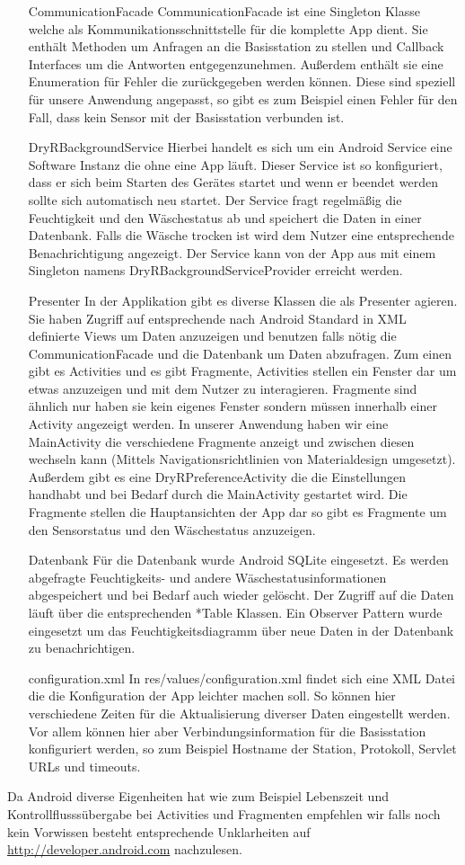 \begin{enumerate}
	\item[CommunicationFacade] CommunicationFacade ist eine Singleton Klasse welche als Kommunikationsschnittstelle für die komplette App dient. Sie enthält Methoden um Anfragen an die Basisstation zu stellen und Callback Interfaces um die Antworten entgegenzunehmen. Außerdem enthält sie eine Enumeration für Fehler die zurückgegeben werden können. Diese sind speziell für unsere Anwendung angepasst, so gibt es zum Beispiel einen Fehler für den Fall, dass kein Sensor mit der Basisstation verbunden ist.
	
	\item[DryRBackgroundService] Hierbei handelt es sich um ein Android Service eine Software Instanz die ohne eine App läuft. Dieser Service ist so konfiguriert, dass er sich beim Starten des Gerätes startet und wenn er beendet werden sollte sich automatisch neu startet. Der Service fragt regelmäßig die Feuchtigkeit und den Wäschestatus ab und speichert die Daten in einer Datenbank. Falls die Wäsche trocken ist wird dem Nutzer eine entsprechende Benachrichtigung angezeigt. Der Service kann von der App aus mit einem Singleton namens DryRBackgroundServiceProvider erreicht werden.
	
	\item[Presenter] In der Applikation gibt es diverse Klassen die als Presenter agieren. Sie haben Zugriff auf entsprechende nach Android Standard in XML definierte Views um Daten anzuzeigen und benutzen falls nötig die CommunicationFacade und die Datenbank um Daten abzufragen. Zum einen gibt es Activities und es gibt Fragmente, Activities stellen ein Fenster dar um etwas anzuzeigen und mit dem Nutzer zu interagieren. Fragmente sind ähnlich nur haben sie kein eigenes Fenster sondern müssen innerhalb einer Activity angezeigt werden. In unserer Anwendung haben wir eine MainActivity die verschiedene Fragmente anzeigt und zwischen diesen wechseln kann (Mittels Navigationsrichtlinien von Materialdesign umgesetzt). Außerdem gibt es eine DryRPreferenceActivity die die Einstellungen handhabt und bei Bedarf durch die MainActivity gestartet wird. Die Fragmente stellen die Hauptansichten der App dar so gibt es Fragmente um den Sensorstatus und den Wäschestatus anzuzeigen.
	
	\item[Datenbank] Für die Datenbank wurde Android SQLite eingesetzt. Es werden abgefragte Feuchtigkeits- und andere Wäschestatusinformationen abgespeichert und bei Bedarf auch wieder gelöscht. Der Zugriff auf die Daten läuft über die entsprechenden *Table Klassen. Ein Observer Pattern wurde eingesetzt um das Feuchtigkeitsdiagramm über neue Daten in der Datenbank zu benachrichtigen.
	
	\item[configuration.xml] In res/values/configuration.xml findet sich eine XML Datei die die Konfiguration der App leichter machen soll. So können hier verschiedene Zeiten für die Aktualisierung diverser Daten eingestellt werden. Vor allem können hier aber Verbindungsinformation für die Basisstation konfiguriert werden, so zum Beispiel Hostname der Station, Protokoll, Servlet URLs und timeouts.
\end{enumerate}

Da Android diverse Eigenheiten hat wie zum Beispiel Lebenszeit und Kontrollflusssübergabe bei Activities und Fragmenten empfehlen wir falls noch kein Vorwissen besteht entsprechende Unklarheiten auf \url{http://developer.android.com} nachzulesen.
